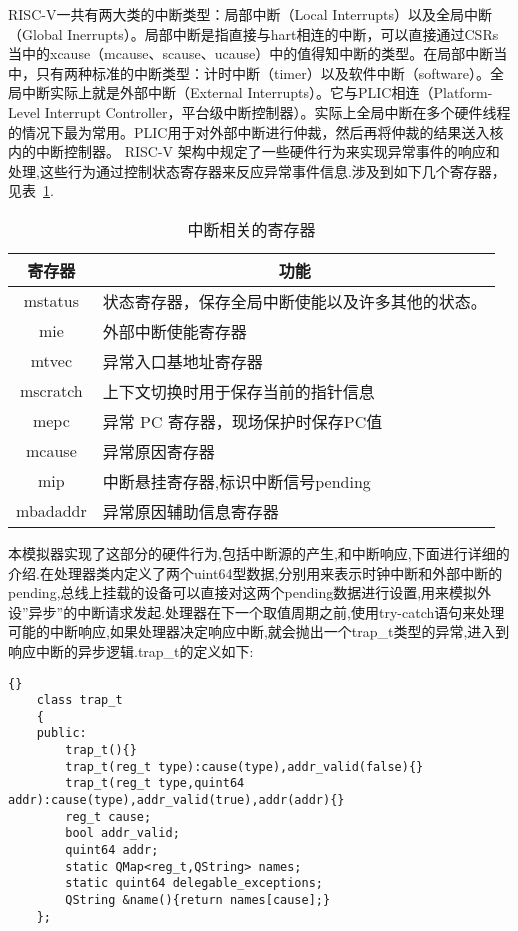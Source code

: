 RISC-V一共有两大类的中断类型：局部中断（Local Interrupts）以及全局中断（Global Inerrupts）。局部中断是指直接与hart相连的中断，可以直接通过CSRs当中的xcause（mcause、scause、ucause）中的值得知中断的类型。在局部中断当中，只有两种标准的中断类型：计时中断（timer）以及软件中断（software）。全局中断实际上就是外部中断（External Interrupts）。它与PLIC相连（Platform-Level Interrupt Controller，平台级中断控制器）。实际上全局中断在多个硬件线程的情况下最为常用。PLIC用于对外部中断进行仲裁，然后再将仲裁的结果送入核内的中断控制器。
RISC-V 架构中规定了一些硬件行为来实现异常事件的响应和处理,这些行为通过控制状态寄存器来反应异常事件信息.涉及到如下几个寄存器，见表~\ref{tab:csr}.
\begin{table}[h]
  \centering
  \caption{中断相关的寄存器}
  \label{tab:csr}
  \begin{tabular}{cl}
    \toprule
寄存器	& \multicolumn{1}{c}{功能}\\
    \midrule
    mstatus	& \multicolumn{1}{m{9cm}}{状态寄存器，保存全局中断使能以及许多其他的状态。}\\ \hline
    mie	& \multicolumn{1}{m{9cm}}{外部中断使能寄存器}\\ \hline
    mtvec	& \multicolumn{1}{m{9cm}}{异常入口基地址寄存器}\\ \hline
    mscratch & \multicolumn{1}{m{9cm}}{上下文切换时用于保存当前的指针信息}\\ \hline
    mepc & \multicolumn{1}{m{9cm}}{异常 PC 寄存器，现场保护时保存PC值}\\ \hline
    mcause & \multicolumn{1}{m{9cm}}{异常原因寄存器}\\ \hline
    mip	& \multicolumn{1}{m{9cm}}{中断悬挂寄存器,标识中断信号pending}\\ \hline
    mbadaddr & \multicolumn{1}{m{9cm}}{异常原因辅助信息寄存器}\\
    \bottomrule
  \end{tabular}
\end{table}

本模拟器实现了这部分的硬件行为,包括中断源的产生,和中断响应,下面进行详细的介绍.在处理器类内定义了两个uint64型数据,分别用来表示时钟中断和外部中断的pending,总线上挂载的设备可以直接对这两个pending数据进行设置,用来模拟外设”异步”的中断请求发起.处理器在下一个取值周期之前,使用try-catch语句来处理可能的中断响应,如果处理器决定响应中断,就会抛出一个trap\_t类型的异常,进入到响应中断的异步逻辑.trap\_t的定义如下:
\begin{lstlisting}{}
    class trap_t
    {
    public:
        trap_t(){}
        trap_t(reg_t type):cause(type),addr_valid(false){}
        trap_t(reg_t type,quint64 addr):cause(type),addr_valid(true),addr(addr){}
        reg_t cause;
        bool addr_valid;
        quint64 addr;
        static QMap<reg_t,QString> names;
        static quint64 delegable_exceptions;
        QString &name(){return names[cause];}
    };        
\end{lstlisting}

